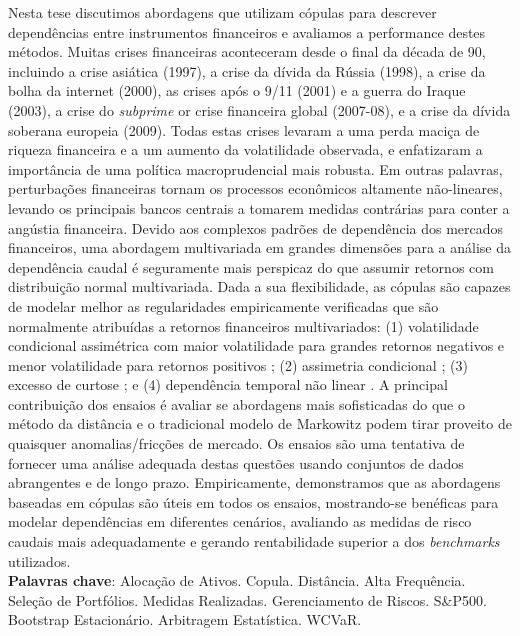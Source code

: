 \documentclass[a4paper,12pt]{report}
\begin{document}
	\begin{refsection}
	
	\setlength{\baselineskip}{12pt}
	\noindent Nesta tese discutimos abordagens que utilizam cópulas para descrever dependências entre instrumentos financeiros e avaliamos a performance destes métodos. Muitas crises financeiras aconteceram desde o final da década de 90, incluindo a crise asiática (1997), a crise da dívida da Rússia (1998), a crise da bolha da internet (2000), as crises após o 9/11 (2001) e a guerra do Iraque (2003), a crise do \emph{subprime} or crise financeira global (2007-08), e a crise da dívida soberana europeia (2009). Todas estas crises levaram a uma perda maciça de riqueza financeira e a um aumento da volatilidade observada, e enfatizaram a importância de uma política macroprudencial mais robusta. Em outras palavras, perturbações financeiras tornam os processos econômicos altamente não-lineares, levando os principais bancos centrais a tomarem medidas contrárias para conter a angústia financeira. Devido aos complexos padrões de dependência dos mercados financeiros, uma abordagem multivariada em grandes dimensões para a análise da dependência caudal é seguramente mais perspicaz do que assumir retornos com distribuição normal multivariada. Dada a sua flexibilidade, as cópulas são capazes de modelar melhor as regularidades empiricamente verificadas que são normalmente atribuídas a retornos financeiros multivariados: (1) volatilidade condicional assimétrica com maior volatilidade para grandes retornos negativos e menor volatilidade para retornos positivos \citep{h98}; (2) assimetria condicional \citep{ait01,chen01,patton01}; (3) excesso de curtose \citep{t01,andreou01}; e (4) dependência temporal não linear \citep{cont01,campbell97}. A principal contribuição dos ensaios é avaliar se abordagens mais sofisticadas do que o método da distância e o tradicional modelo de Markowitz podem tirar proveito de quaisquer anomalias/fricções de mercado. Os ensaios são uma tentativa de fornecer uma análise adequada destas questões usando conjuntos de dados abrangentes e de longo prazo. Empiricamente, demonstramos que as abordagens baseadas em cópulas são úteis em todos os ensaios, mostrando-se benéficas para modelar dependências em diferentes cenários, avaliando as medidas de risco caudais mais adequadamente e gerando rentabilidade superior a dos \emph{benchmarks} utilizados. \\
	
	\noindent
	\textbf{Palavras chave}: Alocação de Ativos. Copula. Distância. Alta Frequência. Seleção de Portfólios. Medidas Realizadas. Gerenciamento de Riscos. S\&P500. Bootstrap Estacionário. Arbitragem Estatística. WCVaR.
	

\end{refsection}
\end{document}
